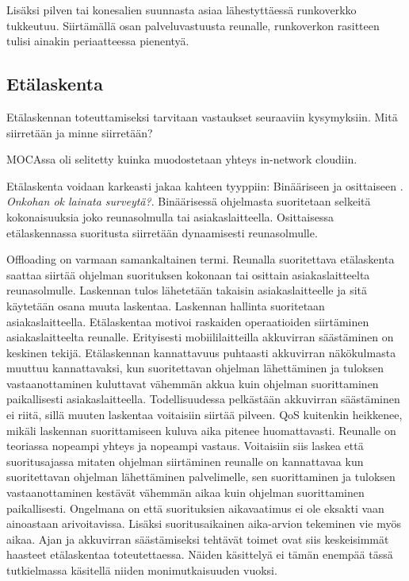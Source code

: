 \documentclass[finnish]{tktltiki2}
\theoremstyle{definition}
\theoremstyle{remark}
\begin{document}
Lisäksi pilven tai konesalien suunnasta asiaa lähestyttäessä runkoverkko tukkeutuu. Siirtämällä osan palveluvastuusta reunalle, runkoverkon rasitteen tulisi ainakin periaatteessa pienentyä. 


\subsection{Etälaskenta}
Etälaskennan toteuttamiseksi tarvitaan vastaukset seuraaviin kysymyksiin. Mitä siirretään ja minne siirretään?

MOCAssa oli selitetty kuinka muodostetaan yhteys in-network cloudiin.

Etälaskenta voidaan karkeasti jakaa kahteen tyyppiin: Binääriseen ja osittaiseen \cite{mao17}. \textit{Onkohan ok lainata surveytä?}. Binäärisessä ohjelmasta suoritetaan selkeitä kokonaisuuksia joko reunasolmulla tai asiakaslaitteella. Osittaisessa etälaskennassa suoritusta siirretään dynaamisesti reunasolmulle. 

Offloading on varmaan samankaltainen termi.
Reunalla suoritettava etälaskenta saattaa siirtää ohjelman suorituksen kokonaan tai osittain asiakaslaitteelta reunasolmulle. Laskennan tulos lähetetään takaisin asiakaslaitteelle ja sitä käytetään osana muuta laskentaa. 
Laskennan hallinta suoritetaan asiakaslaitteella. Etälaskentaa motivoi raskaiden operaatioiden siirtäminen asiakaslaitteelta reunalle. Erityisesti mobiililaitteilla akkuvirran säästäminen on keskinen tekijä. Etälaskennan kannattavuus puhtaasti akkuvirran näkökulmasta muuttuu kannattavaksi, kun suoritettavan ohjelman lähettäminen ja tuloksen vastaanottaminen kuluttavat vähemmän akkua kuin ohjelman suorittaminen paikallisesti asiakaslaitteella.
Todellisuudessa pelkästään akkuvirran säästäminen ei riitä, sillä muuten laskentaa voitaisiin siirtää pilveen. QoS kuitenkin heikkenee, mikäli laskennan suorittamiseen kuluva aika pitenee huomattavasti.
Reunalle on teoriassa nopeampi yhteys ja nopeampi vastaus. Voitaisiin siis laskea että suoritusajassa mitaten ohjelman siirtäminen reunalle on kannattavaa kun suoritettavan ohjelman lähettäminen palvelimelle, sen suorittaminen ja tuloksen vastaanottaminen kestävät vähemmän aikaa kuin ohjelman suorittaminen paikallisesti. 
Ongelmana on että suorituksien aikavaatimus ei ole eksakti vaan ainoastaan arivoitavissa. Lisäksi suoritusaikainen aika-arvion tekeminen vie myös aikaa. 
Ajan ja akkuvirran säästämiseksi tehtävät toimet ovat siis keskeisimmät haasteet etälaskentaa toteutettaessa. Näiden käsittelyä ei tämän enempää tässä tutkielmassa käsitellä niiden monimutkaisuuden vuoksi.
\end{document}
